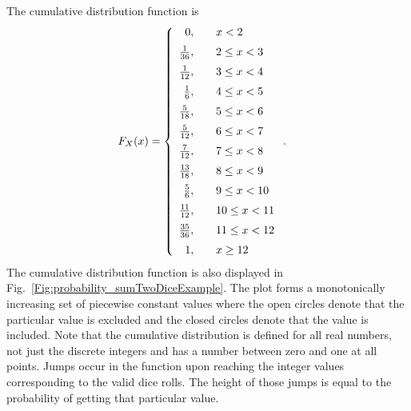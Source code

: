 The cumulative distribution function is
\begin{align}
  F_X(x) &= \left\{ \begin{array}{r l}
  0, & \quad x < 2 \vspace{0.2cm} \\
  \frac{1}{36},  & \quad 2  \le x < 3  \vspace{0.2cm} \\ 
  \frac{1}{12},  & \quad 3  \le x < 4  \vspace{0.2cm} \\ 
  \frac{1}{6},   & \quad 4  \le x < 5  \vspace{0.2cm} \\ 
  \frac{5}{18},  & \quad 5  \le x < 6  \vspace{0.2cm} \\ 
  \frac{5}{12},  & \quad 6  \le x < 7  \vspace{0.2cm} \\ 
  \frac{7}{12},  & \quad 7  \le x < 8  \vspace{0.2cm} \\ 
  \frac{13}{18}, & \quad 8  \le x < 9  \vspace{0.2cm} \\ 
  \frac{5}{6},   & \quad 9  \le x < 10 \vspace{0.2cm} \\ 
  \frac{11}{12}, & \quad 10 \le x < 11 \vspace{0.2cm} \\ 
  \frac{35}{36}, & \quad 11 \le x < 12 \vspace{0.2cm} \\ 
  1,             & \quad x \ge 12 \\ \end{array} \right. .
\end{align}
The cumulative distribution function is also displayed in Fig.~\ref{Fig:probability_sumTwoDiceExample}. The plot forms a monotonically increasing set of piecewise constant values where the open circles denote that the particular value is excluded and the closed circles denote that the value is included. Note that the cumulative distribution is defined for all real numbers, not just the discrete integers and has a number between zero and one at all points. Jumps occur in the function upon reaching the integer values corresponding to the valid dice rolls. The height of those jumps is equal to the probability of getting that particular value.

